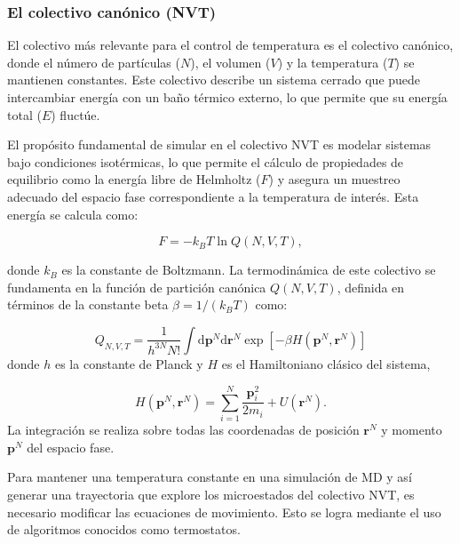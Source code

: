 \subsubsection*{El colectivo canónico (NVT)}

El colectivo más relevante para el control de temperatura es el colectivo canónico, donde el número de partículas ($N$), el volumen ($V$) y la temperatura ($T$) se mantienen constantes. Este colectivo describe un sistema cerrado que puede intercambiar energía con un baño térmico externo, lo que permite que su energía total ($E$) fluctúe.

El propósito fundamental de simular en el colectivo NVT es modelar sistemas bajo condiciones isotérmicas, lo que permite el cálculo de propiedades de equilibrio como la energía libre de Helmholtz ($F$) y asegura un muestreo adecuado del espacio fase correspondiente a la temperatura de interés. Esta energía se calcula como:

\begin{equation}
    F = - k_B T \ln Q(N, V, T), 
    \label{eq:helmholtz_free_energy}
\end{equation}

\noindent donde $k_B$ es la constante de Boltzmann. La termodinámica de este colectivo se fundamenta en la función de partición canónica $Q(N, V, T)$, definida en términos de la constante beta $\beta = 1/(k_B T)$ como:

\begin{equation}
    Q_{N,V,T} = \frac{1}{h^{3N}N!} \int \mathrm{d}\mathbf{p}^N \mathrm{d}\mathbf{r}^N \exp[-\beta H(\mathbf{p}^N, \mathbf{r}^N)]
    \label{eq:canonical_partition_function}
\end{equation}
donde $h$ es la constante de Planck y $H$ es el Hamiltoniano clásico del sistema,

\begin{equation}
    H(\mathbf{p}^N, \mathbf{r}^N) = \sum_{i=1}^{N} \frac{\mathbf{p}_i^2}{2m_i} + U\left(\mathbf{r}^N\right).
    \label{eq:classical_hamiltonian}
\end{equation}
La integración se realiza sobre todas las coordenadas de posición $\mathbf{r}^N$ y momento $\mathbf{p}^N$ del espacio fase.

Para mantener una temperatura constante en una simulación de MD y así generar una trayectoria que explore los microestados del colectivo NVT, es necesario modificar las ecuaciones de movimiento. Esto se logra mediante el uso de algoritmos conocidos como termostatos.

